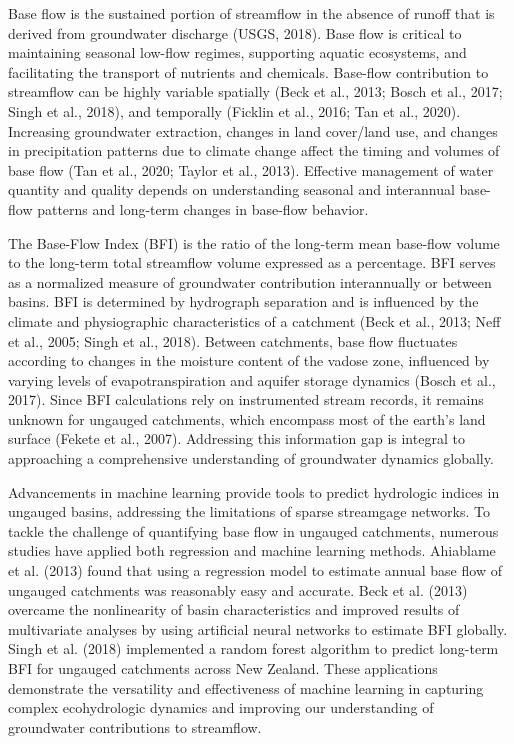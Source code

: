 \documentclass[
]{agujournal2019}
\begin{document}
Base flow is the sustained portion of streamflow in the absence of
runoff that is derived from groundwater discharge (USGS, 2018). Base
flow is critical to maintaining seasonal low-flow regimes, supporting
aquatic ecosystems, and facilitating the transport of nutrients and
chemicals. Base-flow contribution to streamflow can be highly variable
spatially (Beck et al., 2013; Bosch et al., 2017; Singh et al., 2018),
and temporally (Ficklin et al., 2016; Tan et al., 2020). Increasing
groundwater extraction, changes in land cover/land use, and changes in
precipitation patterns due to climate change affect the timing and
volumes of base flow (Tan et al., 2020; Taylor et al., 2013). Effective
management of water quantity and quality depends on understanding
seasonal and interannual base-flow patterns and long-term changes in
base-flow behavior.

The Base-Flow Index (BFI) is the ratio of the long-term mean base-flow
volume to the long-term total streamflow volume expressed as a
percentage. BFI serves as a normalized measure of groundwater
contribution interannually or between basins. BFI is determined by
hydrograph separation and is influenced by the climate and physiographic
characteristics of a catchment (Beck et al., 2013; Neff et al., 2005;
Singh et al., 2018). Between catchments, base flow fluctuates according
to changes in the moisture content of the vadose zone, influenced by
varying levels of evapotranspiration and aquifer storage dynamics (Bosch
et al., 2017). Since BFI calculations rely on instrumented stream
records, it remains unknown for ungauged catchments, which encompass
most of the earth's land surface (Fekete et al., 2007). Addressing this
information gap is integral to approaching a comprehensive understanding
of groundwater dynamics globally.

Advancements in machine learning provide tools to predict hydrologic
indices in ungauged basins, addressing the limitations of sparse
streamgage networks. To tackle the challenge of quantifying base flow in
ungauged catchments, numerous studies have applied both regression and
machine learning methods. Ahiablame et al. (2013) found that using a
regression model to estimate annual base flow of ungauged catchments was
reasonably easy and accurate. Beck et al. (2013) overcame the
nonlinearity of basin characteristics and improved results of
multivariate analyses by using artificial neural networks to estimate
BFI globally. Singh et al. (2018) implemented a random forest algorithm
to predict long-term BFI for ungauged catchments across New Zealand.
These applications demonstrate the versatility and effectiveness of
machine learning in capturing complex ecohydrologic dynamics and
improving our understanding of groundwater contributions to streamflow.
\end{document}
